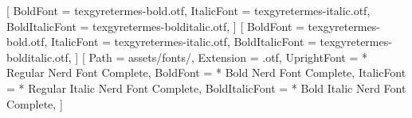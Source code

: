 
\RequirePackage{iftex}

\ifLuaTeX
    \RequirePackage{fontspec}
    \setmainfont{texgyretermes-regular.otf}[
        BoldFont = texgyretermes-bold.otf,
        ItalicFont = texgyretermes-italic.otf,
        BoldItalicFont = texgyretermes-bolditalic.otf,
    ]
    \setsansfont{texgyretermes-regular.otf}[
        BoldFont = texgyretermes-bold.otf,
        ItalicFont = texgyretermes-italic.otf,
        BoldItalicFont = texgyretermes-bolditalic.otf,
    ]
    \setmonofont{SFMono}[
        Path = assets/fonts/,
        Extension = .otf,
        UprightFont = * Regular Nerd Font Complete,
        BoldFont = * Bold Nerd Font Complete,
        ItalicFont = * Regular Italic Nerd Font Complete,
        BoldItalicFont = * Bold Italic Nerd Font Complete,
    ]
\else
    \RequirePackage[T1]{fontenc}
    \RequirePackage[utf8]{inputenc}
    \RequirePackage{newtxtext}
\fi

\RequirePackage{amsmath,mathtools,amsthm}
\RequirePackage{newtxmath}

\let\Bbbk\relax
\RequirePackage{amsfonts,amssymb}

\RequirePackage{graphicx}
\RequirePackage{float}
\RequirePackage{enumitem}
\RequirePackage{etoolbox}
\RequirePackage{xcolor}

\RequirePackage{tikz}
\usetikzlibrary{arrows,arrows.meta,calc,shadows,shadows.blur,shapes.geometric,positioning,fit}



\RequirePackage{hyperref}














